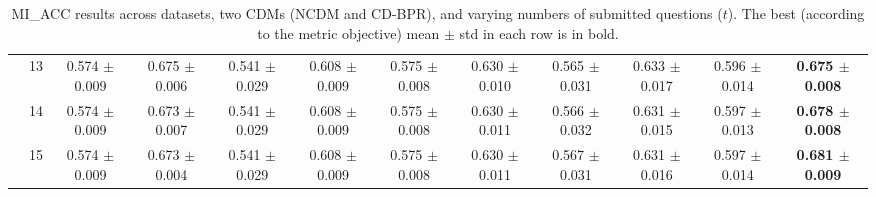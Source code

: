 \begin{table*}[t]
{\begin{tabular}{%
  ll
  @{\quad}
  c@{\hskip 4pt}c
  @{\quad\quad}
  c@{\hskip 4pt}c
  @{\quad\quad}
  c@{\hskip 4pt}c
  @{\quad\quad}
  c@{\hskip 4pt}c
  @{\quad\quad}
  c@{\hskip 4pt}c
}
        & 13 & 0.574 $\pm$ 0.009 & 0.675 $\pm$ 0.006 & 0.541 $\pm$ 0.029 & 0.608 $\pm$ 0.009 & 0.575 $\pm$ 0.008 & 0.630 $\pm$ 0.010 & 0.565 $\pm$ 0.031 & 0.633 $\pm$ 0.017 & 0.596 $\pm$ 0.014 & \textbf{0.675 $\pm$ 0.008} \\
        & 14 & 0.574 $\pm$ 0.009 & 0.673 $\pm$ 0.007 & 0.541 $\pm$ 0.029 & 0.608 $\pm$ 0.009 & 0.575 $\pm$ 0.008 & 0.630 $\pm$ 0.011 & 0.566 $\pm$ 0.032 & 0.631 $\pm$ 0.015 & 0.597 $\pm$ 0.013 & \textbf{0.678 $\pm$ 0.008} \\
        & 15 & 0.574 $\pm$ 0.009 & 0.673 $\pm$ 0.004 & 0.541 $\pm$ 0.029 & 0.608 $\pm$ 0.009 & 0.575 $\pm$ 0.008 & 0.630 $\pm$ 0.011 & 0.567 $\pm$ 0.031 & 0.631 $\pm$ 0.016 & 0.597 $\pm$ 0.014 & \textbf{0.681 $\pm$ 0.009} \\
\bottomrule
\end{tabular}
}
\caption{MI_ACC results across datasets, two CDMs (NCDM and CD-BPR), and varying numbers of submitted questions ($t$). The best (according to the metric objective) mean $\pm$ std in each row is in bold.}
\label{tab:results-mi_acc}
\end{table*}


